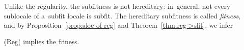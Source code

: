 \begin{rem}[Fitness]
  Unlike the regularity, the subfitness is not hereditary:
  in~general, not every sublocale of a~subfit locale is subfit.
  The hereditary subfitness is called \emph{fitness\/}, and by
  Proposition~\ref{prop:sloc-of-reg} and Theorem~\ref{thm:reg->sfit}, we infer
\end{rem}
\begin{obs}
  (Reg) implies the fitness.
\end{obs}
